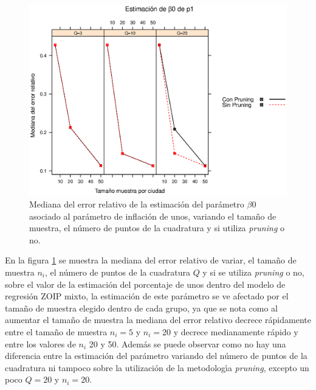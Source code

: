 \begin{figure}
	\begin{center}
		\includegraphics[scale=0.6]{MAPE_beta0_p1.eps}	
		\caption{Mediana del error relativo de la estimaci\'{o}n del par\'{a}metro $\beta0$ asociado al par\'{a}metro de inflaci\'{o}n de unos, variando el tama\~{n}o de muestra, el n\'{u}mero de puntos de la cuadratura y si utiliza \textit{pruning} o no.}
		\label{MAPE_beta0_p1}
	\end{center}
\end{figure}

En la figura \ref{MAPE_beta0_p1} se muestra la mediana del error relativo de variar, el tama\~{n}o de muestra $n_i$, el n\'{u}mero de puntos de la cuadratura $Q$ y si se utiliza \textit{pruning} o no, sobre el valor de la estimaci\'{o}n del porcentaje de unos dentro del modelo de regresi\'{o}n ZOIP mixto, la estimaci\'{o}n de este par\'{a}metro se ve afectado por el tama\~{n}o de muestra elegido dentro de cada grupo, ya que se nota como al aumentar el tama\~{n}o de muestra la mediana del error relativo decrece r\'{a}pidamente entre el tama\~{n}o de muestra $n_i=5$ y $n_i=20$ y decrece medianamente r\'{a}pido y entre los valores de $n_i$ 20 y 50. Adem\'{a}s se puede observar como no hay una diferencia entre la estimaci\'{o}n del par\'{a}metro variando del n\'{u}mero de puntos de la cuadratura ni tampoco sobre la utilizaci\'{o}n de la metodolog\'{\i}a \textit{pruning}, excepto un poco $Q=20$ y $n_i=20$.\\

